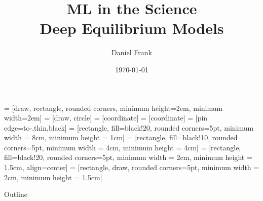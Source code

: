 \documentclass[8pt, t,
aspectratio=169,%
]{beamer}
\title[\Acrfull{deq}]{ML in the Science \\ Deep Equilibrium Models}
\author[]{Daniel Frank}
\institute[Analytic Computing]{Institute for Parallel and Distributed Systems}
\date{\today}
\begin{document}
 = [draw, rectangle, rounded corners, minimum height=2em, minimum width=2em]
 = [draw, circle]
 = [coordinate]
 = [coordinate]
 = [pin edge={to-,thin,black}]
 = [rectangle, fill=black!20, rounded corners=5pt, minimum width = 8cm, minimum height = 1cm]
 = [rectangle, fill=black!10, rounded corners=5pt, minimum width = 4cm, minimum height = 4cm]
 = [rectangle, fill=black!20, rounded corners=5pt, minimum width = 2cm, minimum height = 1.5cm, align=center]
 = [rectangle, draw, rounded corners=5pt, minimum width = 2cm, minimum height = 1.5cm]

\begin{frame}[plain]
  \titlepage
\end{frame}

\begin{frame}{Outline}
  \tableofcontents
\end{frame}
\end{document}
